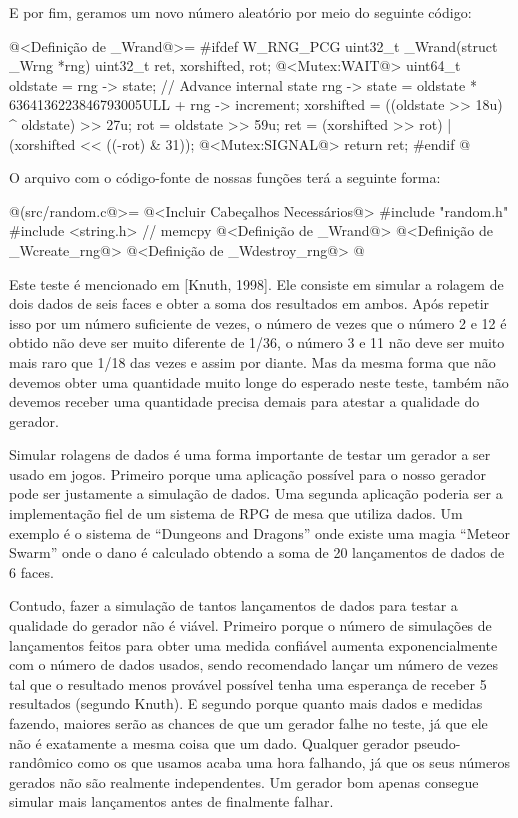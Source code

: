 E por fim, geramos um novo número aleatório por meio do seguinte código:

\iniciocodigo
@<Definição de \_Wrand@>=
#ifdef W_RNG_PCG
uint32_t _Wrand(struct _Wrng *rng){
  uint32_t ret, xorshifted, rot;
  @<Mutex:WAIT@>
  uint64_t oldstate = rng -> state;
  // Advance internal state
  rng -> state = oldstate * 6364136223846793005ULL + rng -> increment;
  xorshifted = ((oldstate >> 18u) ^ oldstate) >> 27u;
  rot = oldstate >> 59u;
  ret = (xorshifted >> rot) | (xorshifted << ((-rot) & 31));
  @<Mutex:SIGNAL@>
  return ret;
}
#endif
@
\fimcodigo


O arquivo com o código-fonte de nossas funções terá a seguinte forma:


\iniciocodigo
@(src/random.c@>=
@<Incluir Cabeçalhos Necessários@>
#include "random.h"
#include <string.h> // memcpy
@<Definição de \_Wrand@>
@<Definição de \_Wcreate\_rng@>
@<Definição de \_Wdestroy\_rng@>
@
\fimcodigo



Este teste é mencionado em [Knuth, 1998]. Ele consiste em simular a
rolagem de dois dados de seis faces e obter a soma dos resultados em
ambos. Após repetir isso por um número suficiente de vezes, o número
de vezes que o número 2 e 12 é obtido não deve ser muito diferente de
1/36, o número 3 e 11 não deve ser muito mais raro que 1/18 das vezes
e assim por diante. Mas da mesma forma que não devemos obter uma
quantidade muito longe do esperado neste teste, também não devemos
receber uma quantidade precisa demais para atestar a qualidade do
gerador.

Simular rolagens de dados é uma forma importante de testar um gerador
a ser usado em jogos. Primeiro porque uma aplicação possível para o
nosso gerador pode ser justamente a simulação de dados. Uma segunda
aplicação poderia ser a implementação fiel de um sistema de RPG de
mesa que utiliza dados. Um exemplo é o sistema de ``Dungeons and
Dragons'' onde existe uma magia ``Meteor Swarm'' onde o dano é
calculado obtendo a soma de 20 lançamentos de dados de 6 faces.

Contudo, fazer a simulação de tantos lançamentos de dados para testar
a qualidade do gerador não é viável. Primeiro porque o número de
simulações de lançamentos feitos para obter uma medida confiável
aumenta exponencialmente com o número de dados usados, sendo
recomendado lançar um número de vezes tal que o resultado menos
provável possível tenha uma esperança de receber 5 resultados (segundo
Knuth). E segundo porque quanto mais dados e medidas fazendo, maiores
serão as chances de que um gerador falhe no teste, já que ele não é
exatamente a mesma coisa que um dado. Qualquer gerador
pseudo-randômico como os que usamos acaba uma hora falhando, já que os
seus números gerados não são realmente independentes. Um gerador bom
apenas consegue simular mais lançamentos antes de finalmente falhar.

